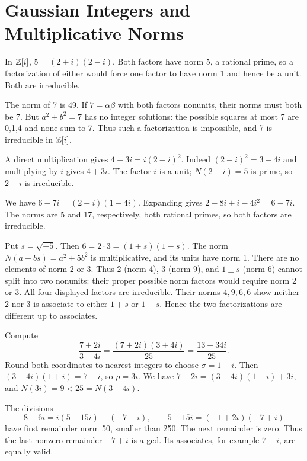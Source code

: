 \section{Gaussian Integers and Multiplicative Norms}

In $\mathbb{Z}[i]$, $5=(2+i)(2-i)$. Both factors have norm 5, a rational prime, so a factorization of either would force one factor to have norm 1 and hence be a unit. Both are irreducible.

The norm of 7 is 49. If $7=\alpha\beta$ with both factors nonunits, their norms must both be 7. But $a^2+b^2=7$ has no integer solutions: the possible squares at most 7 are 0,1,4 and none sum to 7. Thus such a factorization is impossible, and 7 is irreducible in $\mathbb{Z}[i]$.

A direct multiplication gives $4+3i=i(2-i)^2$. Indeed $(2-i)^2=3-4i$ and multiplying by $i$ gives $4+3i$. The factor $i$ is a unit; $N(2-i)=5$ is prime, so $2-i$ is irreducible.

We have $6-7i=(2+i)(1-4i)$. Expanding gives $2-8i+i-4i^2=6-7i$. The norms are 5 and 17, respectively, both rational primes, so both factors are irreducible.

Put $s=\sqrt{-5}$. Then $6=2\cdot3=(1+s)(1-s)$. The norm $N(a+bs)=a^2+5b^2$ is multiplicative, and its units have norm 1. There are no elements of norm 2 or 3. Thus 2 (norm 4), 3 (norm 9), and $1\pm s$ (norm 6) cannot split into two nonunits: their proper possible norm factors would require norm 2 or 3. All four displayed factors are irreducible. Their norms $4,9,6,6$ show neither 2 nor 3 is associate to either $1+s$ or $1-s$. Hence the two factorizations are different up to associates.

Compute
\[\frac{7+2i}{3-4i}=\frac{(7+2i)(3+4i)}{25}=\frac{13+34i}{25}.\]
Round both coordinates to nearest integers to choose $\sigma=1+i$. Then $(3-4i)(1+i)=7-i$, so $\rho=3i$. We have $7+2i=(3-4i)(1+i)+3i$, and $N(3i)=9<25=N(3-4i)$.

The divisions
\[8+6i=i(5-15i)+(-7+i),\qquad 5-15i=(-1+2i)(-7+i)\]
have first remainder norm 50, smaller than 250. The next remainder is zero. Thus the last nonzero remainder $-7+i$ is a gcd. Its associates, for example $7-i$, are equally valid.

